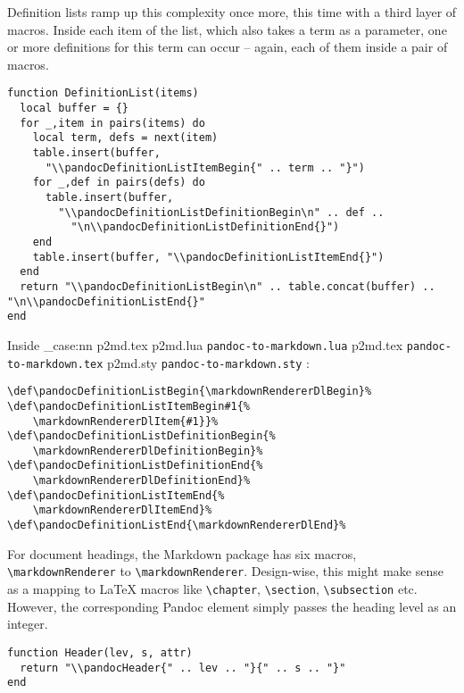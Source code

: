 \documentclass[
  digital,     %
  oneside,     %
  nosansbold,  %
  nocolorbold, %
  lof,         %
  nolot,       %
]{fithesis4}
\newcommand\macro[1]{\texttt{\textbackslash{}{#1}}}
\newcommand\renderer[1]{\macro{markdown\-Renderer\-{#1}}}
\newcommand\file[1]
  {
    \str_case:nn
      { #1 }
      {
        { p2md.lua } { \texttt{pandoc\hyp{}to\hyp{}markdown.lua} }
        { p2md.tex } { \texttt{pandoc\hyp{}to\hyp{}markdown.tex} }
        { p2md.sty } { \texttt{pandoc\hyp{}to\hyp{}markdown.sty} }
      }
  }
\begin{document}
\noindent
Definition lists ramp up this complexity once more, this time with a third layer of macros. Inside  each item of the list, which also takes a term as a parameter, one or more definitions for this term can occur -- again, each of them inside a pair of macros.

\noindent
\lstset{language=[5.3]Lua}
\begin{lstlisting}
function DefinitionList(items)
  local buffer = {}
  for _,item in pairs(items) do
    local term, defs = next(item)
    table.insert(buffer,
      "\\pandocDefinitionListItemBegin{" .. term .. "}")
    for _,def in pairs(defs) do
      table.insert(buffer,
        "\\pandocDefinitionListDefinitionBegin\n" .. def ..
          "\n\\pandocDefinitionListDefinitionEnd{}")
    end
    table.insert(buffer, "\\pandocDefinitionListItemEnd{}")
  end
  return "\\pandocDefinitionListBegin\n" .. table.concat(buffer) .. "\n\\pandocDefinitionListEnd{}"
end
\end{lstlisting}

\noindent
Inside \file{p2md.tex}:

\noindent
\lstset{language=[plain]TeX}
\begin{lstlisting}
\def\pandocDefinitionListBegin{\markdownRendererDlBegin}%
\def\pandocDefinitionListItemBegin#1{%
    \markdownRendererDlItem{#1}}%
\def\pandocDefinitionListDefinitionBegin{%
    \markdownRendererDlDefinitionBegin}%
\def\pandocDefinitionListDefinitionEnd{%
    \markdownRendererDlDefinitionEnd}%
\def\pandocDefinitionListItemEnd{%
    \markdownRendererDlItemEnd}%
\def\pandocDefinitionListEnd{\markdownRendererDlEnd}%
\end{lstlisting}

\noindent
For document headings, the Markdown package has six macros, \renderer{HeadingOne} to \renderer{HeadingSix}. Design-wise, this might make sense as a mapping to \LaTeX{} macros like \macro{chapter}, \macro{section}, \macro{subsection} etc. However, the corresponding Pandoc element simply passes the heading level as an integer.

\noindent
\lstset{language=[5.3]Lua}
\begin{lstlisting}
function Header(lev, s, attr)
  return "\\pandocHeader{" .. lev .. "}{" .. s .. "}"
end
\end{lstlisting}
\end{document}
